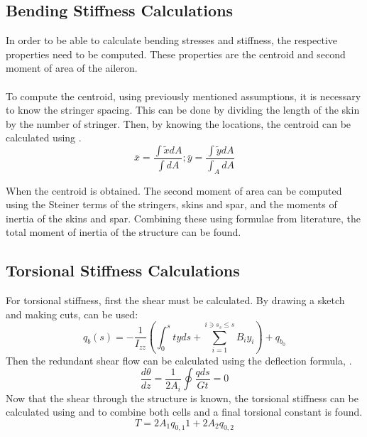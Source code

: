 \subsection{Bending Stiffness Calculations}
In order to be able to calculate bending stresses and stiffness, the respective properties need to be computed. These properties are the centroid and second moment of area of the aileron. \\ \\
To compute the centroid, using previously mentioned assumptions, it is necessary to know the stringer spacing. This can be done by dividing the length of the skin by the number of stringer. Then, by knowing the locations, the centroid can be calculated using .
\begin{equation}
\label{centroid}
    \bar{x}=\frac{\int \tilde{x} d A}{\int d A} ;  \bar{y}=\frac{\int \tilde{y} d A}{\int_{A} d A}
\end{equation}

When the centroid is obtained. The second moment of area can be computed using the Steiner terms of the stringers, skins and spar, and the moments of inertia of the skins and spar. Combining these using formulae from literature, the total moment of inertia of the structure can be found.

\subsection{Torsional Stiffness Calculations}\label{subsec:torsstiffcalc}

For torsional stiffness, first the shear must be calculated. By drawing a sketch and making cuts,  can be used:
\begin{equation}
\label{qb}
    q_{b}(s)=-\frac{1}{I_{z z}}\left(\int_{0}^{s} t y d s+\sum_{i=1}^{i \ni s_{s} \leq s} B_{i} y_{i}\right)+q_{b_{0}}
\end{equation}
\noindent Then the redundant shear flow can be calculated using the deflection formula, . 
\begin{equation}
\label{dtheta}
    \frac{d \theta}{d z}=\frac{1}{2 A_{i}} \oint \frac{q d s}{G t}=0
\end{equation}
Now that the shear through the structure is known, the torsional stiffness can be calculated using  and  to combine both cells and a final torsional constant is found. 
\begin{equation}
\label{T}
    T=2 A_{1} q_{0,1} 1+2 A_{2} q_{0,2}
\end{equation}

